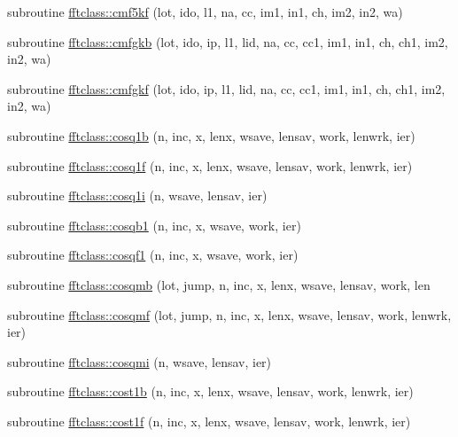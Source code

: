 \begin{DoxyCompactItemize}
\item 
subroutine \mbox{\hyperlink{namespacefftclass_a59cb57b66516dd0b08cf36e366933c56}{fftclass\+::cmf5kf}} (lot, ido, l1, na, cc, im1, in1, ch, im2, in2, wa)
\item 
subroutine \mbox{\hyperlink{namespacefftclass_ab1c60a144232626a03fad4dd30f88d7d}{fftclass\+::cmfgkb}} (lot, ido, ip, l1, lid, na, cc, cc1, im1, in1, ch, ch1, im2, in2, wa)
\item 
subroutine \mbox{\hyperlink{namespacefftclass_a317b5c8887b5c2ecb7e518f0c7058589}{fftclass\+::cmfgkf}} (lot, ido, ip, l1, lid, na, cc, cc1, im1, in1, ch, ch1, im2, in2, wa)
\item 
subroutine \mbox{\hyperlink{namespacefftclass_a6684b378360642f160b255df6b3aa0bd}{fftclass\+::cosq1b}} (n, inc, x, lenx, wsave, lensav, work, lenwrk, ier)
\item 
subroutine \mbox{\hyperlink{namespacefftclass_a546e80f6eb00444bf4508ae26186e0d2}{fftclass\+::cosq1f}} (n, inc, x, lenx, wsave, lensav, work, lenwrk, ier)
\item 
subroutine \mbox{\hyperlink{namespacefftclass_ab281b0d26ef5d825f00696ab35e18e65}{fftclass\+::cosq1i}} (n, wsave, lensav, ier)
\item 
subroutine \mbox{\hyperlink{namespacefftclass_a4f908baf4cda5a6be5b71eb85fc9309c}{fftclass\+::cosqb1}} (n, inc, x, wsave, work, ier)
\item 
subroutine \mbox{\hyperlink{namespacefftclass_a894b76f80148bf5d923d558356a6cc1a}{fftclass\+::cosqf1}} (n, inc, x, wsave, work, ier)
\item 
subroutine \mbox{\hyperlink{namespacefftclass_a766146700483880896edee5e866f29a6}{fftclass\+::cosqmb}} (lot, jump, n, inc, x, lenx, wsave, lensav, work, len
\item 
subroutine \mbox{\hyperlink{namespacefftclass_a48467d0cccf9f7f93786f4997fe714f5}{fftclass\+::cosqmf}} (lot, jump, n, inc, x, lenx, wsave, lensav, work, lenwrk, ier)
\item 
subroutine \mbox{\hyperlink{namespacefftclass_a9851ac46e48072ac6c85e3c574a10dc5}{fftclass\+::cosqmi}} (n, wsave, lensav, ier)
\item 
subroutine \mbox{\hyperlink{namespacefftclass_a2bdaaab2b5d3130f8339f9463daa6db9}{fftclass\+::cost1b}} (n, inc, x, lenx, wsave, lensav, work, lenwrk, ier)
\item 
subroutine \mbox{\hyperlink{namespacefftclass_ae01eaac3c675ef6c95b60a480bda63ba}{fftclass\+::cost1f}} (n, inc, x, lenx, wsave, lensav, work, lenwrk, ier)
\item 

\end{DoxyCompactItemize}
